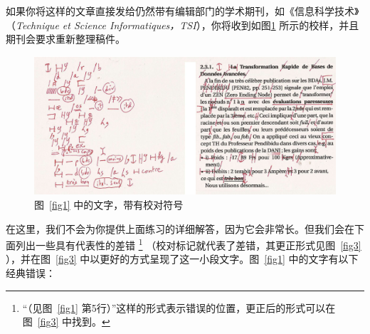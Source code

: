 如果你将这样的文章直接发给仍然带有编辑部门的学术期刊，如《信息科学技术》（\emph{Technique et Science Informatiques，TSI}），你将收到如图\ref{fig2} 所示的校样，并且期刊会要求重新整理稿件。

\begin{figure}
    \centering
    \includegraphics[width = .75\linewidth]{img/2.png}
    \caption{图~\ref{fig1} 中的文字，带有校对符号}
    \label{fig2}
\end{figure}

在这里，我们不会为你提供上面练习的详细解答，因为它会非常长。但我们会在下面列出一些具有代表性的差错
    \footnote{``（见图~\ref{fig1} 第5行）''这样的形式表示错误的位置，更正后的形式可以在图~\ref{fig3} 中找到。}
（校对标记就代表了差错，其更正形式见图~\ref{fig3} ），并在图~\ref{fig3} 中以更好的方式呈现了这一小段文字。图~\ref{fig1} 中的文字有以下经典错误：

